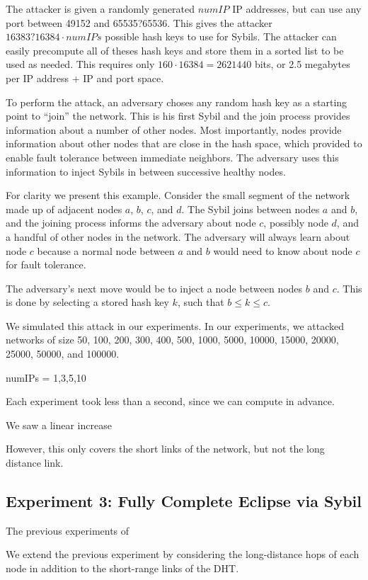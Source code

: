 \documentclass[a4paper]{article}
\begin{document}
The attacker is given a randomly generated $numIP$ IP addresses, but can use any port between 49152 and 65535?65536.
This gives the attacker $ 16383?16384 \cdot numIPs $ possible hash keys to use for Sybils.
The attacker can easily precompute all of theses hash keys and store them in a sorted list to be used as needed.
This requires only $160 \cdot 16384 = 2621440$  bits, or 2.5 megabytes per IP address + IP and port space.

To perform the attack, an adversary choses any random hash key as a starting point to ``join'' the network.
This is his first Sybil and the join process provides information about a number of other nodes.
Most importantly,  nodes provide information about other nodes that are close in the hash space, which provided to enable fault tolerance between immediate neighbors.
The adversary uses this information to inject Sybils in between successive healthy nodes.


For clarity we present this example. 
Consider the small segment of the network made up of adjacent nodes $a$, $b$, $c$, and $d$.
The Sybil joins between nodes $a$ and $b$, and the joining process informs the adversary about node $c$, possibly node $d$, and a handful of other nodes in the network.
The adversary will always learn about node $c$ because a normal node between $a$ and $b$ would need to know about node $c$ for fault tolerance.  

The adversary's next move would be to inject a node between nodes $b$ and $c$.
This is done by selecting a stored hash key $k$, such that $b \leq k \leq c$.



We simulated this attack in our experiments.
In our experiments, we attacked networks of size 50, 100, 200, 300, 400, 500, 1000, 5000, 10000, 15000, 20000, 25000, 50000, and 100000.


numIPs = 1,3,5,10

Each experiment took less than a second, since we can compute in advance.

We saw a linear increase


However, this only covers the short links of the network, but not the long distance link.

\subsection{Experiment 3: Fully Complete Eclipse via Sybil}
The previous experiments of


We extend the previous experiment by considering the long-distance hops of each node in addition to the short-range links of the DHT.
\end{document}

